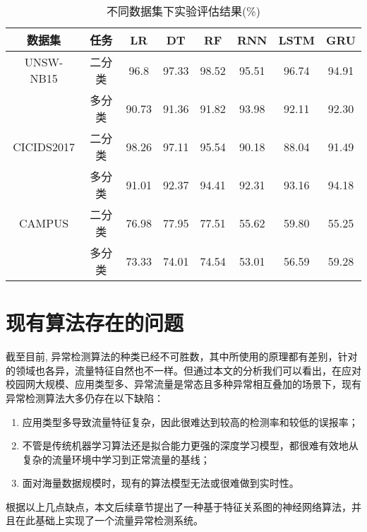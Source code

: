 \begin{table*}[h]
    \small
    \caption{不同数据集下实验评估结果(\%)}
    \label{不同数据集下实验评估结果}
    \centering
    \begin{tabular}{c|c|ccc|ccc}
    \toprule
    
     数据集 &  任务  &  
     LR &  DT & RF & RNN & LSTM & GRU  \\
    \midrule
    
    UNSW-NB15 & 二分类 & 96.8 & 97.33 & 98.52 &  95.51 & 96.74 & 94.91  \\ 
    
    & 多分类 &90.73 & 91.36 & 91.82 & 93.98 & 92.11 & 92.30  \\
    
    \midrule
    CICIDS2017 & 二分类 & 98.26 & 97.11 & 95.54 & 90.18 & 88.04 & 91.49  \\
    & 多分类 & 91.01 & 92.37 & 94.41 & 92.31 & 93.16 & 94.18 \\
    \midrule
    CAMPUS & 二分类 & 76.98 & 77.95 & 77.51 & 55.62 & 59.80 & 55.25 \\
    & 多分类 & 73.33 & 74.01 & 74.54 & 53.01 & 56.59 & 59.28 \\
   
     \bottomrule
    
    \end{tabular}
    \end{table*}


\section{现有算法存在的问题}
截至目前, 异常检测算法的种类已经不可胜数，其中所使用的原理都有差别，针对的领域也各异，流量特征自然也不一样。但通过本文的分析我们可以看出，在应对校园网大规模、应用类型多、异常流量是常态且多种异常相互叠加的场景下，现有异常检测算法大多仍存在以下缺陷：

\begin{enumerate}
  \item 应用类型多导致流量特征复杂，因此很难达到较高的检测率和较低的误报率；
  \item 不管是传统机器学习算法还是拟合能力更强的深度学习模型，都很难有效地从复杂的流量环境中学习到正常流量的基线；
  \item 面对海量数据规模时，现有的算法模型无法或很难做到实时性。
\end{enumerate}

根据以上几点缺点，本文后续章节提出了一种基于特征关系图的神经网络算法，并且在此基础上实现了一个流量异常检测系统。

